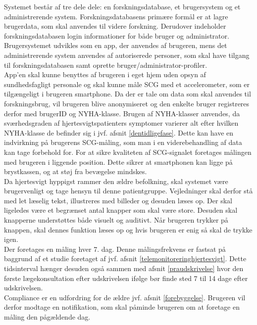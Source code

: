 Systemet består af tre dele dele: en forskningsdatabase, et brugersystem og et administrerende system. Forskningsdatabasens primære formål er at lagre brugerdata, som skal anvendes til videre forskning. Derudover indeholder forskningsdatabasen login informationer for både bruger og administrator. Brugersystemet udvikles som en app, der anvendes af brugeren, mens det administrerende system anvendes af autoriserede personer, som skal have tilgang til forskningsdatabasen samt oprette bruger/administrator-profiler. \\
App'en skal kunne benyttes af brugeren i eget hjem uden opsyn af sundhedsfagligt personale og skal kunne måle SCG med et accelerometer, som er tilgængeligt i brugeren smartphone. Da der er tale om data som skal anvendes til forskningsbrug, vil brugeren blive anonymiseret og den enkelte bruger registreres derfor med brugerID og NYHA-klasse. Brugen af NYHA-klasser anvendes, da sværhedsgraden af hjertesvigtspatienters symptomer varierer alt efter hvilken NYHA-klasse de befinder sig i jvf. afsnit \ref{dentidligefase}. Dette kan have en indvirkning på brugerens SCG-måling, som man i en viderebehandling af data kan tage forbehold for. For at sikre kvaliteten af SCG-signalet foretages målingen med brugeren i liggende position. Dette sikrer at smartphonen kan ligge på brystkassen, og at støj fra bevægelse mindskes. \\
Da hjertesvigt hyppigst rammer den ældre befolkning, skal systemet være brugervenligt og tage hensyn til denne patientgruppe. Vejledninger skal derfor stå med let læselig tekst, illustreres med billeder og desuden læses op. Der skal ligeledes være et begrænset antal knapper som skal være store. Desuden skal knapperne understøttes både visuelt og auditivt. Når brugeren trykker på knappen, skal dennes funktion læses op og hvis brugeren er enig så skal de trykke igen. \\
Der foretages en måling hver 7. dag. Denne målingsfrekvens er fastsat på baggrund af et studie foretaget af \citet{teleprog} jvf. afsnit \ref{telemonitoreringhjertesvigt}. Dette tidsinterval hænger desuden også sammen med afsnit \ref{praudskrivelse} hvor den første lægekonsultation efter udskrivelsen ifølge \cite{Yancy2013} bør finde sted 7 til 14 dage efter udskrivelsen. \\
Compliance er en udfordring for de ældre jvf. afsnit \ref{forebyggelse}. Brugeren vil derfor modtage en notifikation, som skal påminde brugeren om at foretage en måling den pågældende dag. \\
